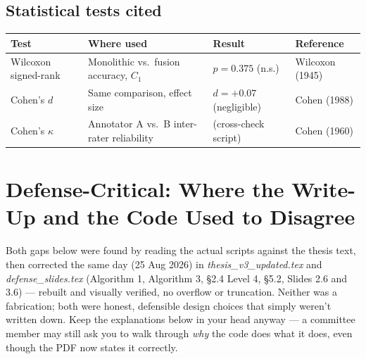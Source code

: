 \documentclass[11pt,a4paper]{article}
\begin{document}
\subsection*{Statistical tests cited}
\begin{center}
\begin{tabular}{@{}p{2.6cm}p{4.4cm}p{2.6cm}p{4cm}@{}}
\toprule
\textbf{Test} & \textbf{Where used} & \textbf{Result} & \textbf{Reference} \\
\midrule
Wilcoxon signed-rank & Monolithic vs.\ fusion accuracy, $C_1$ & $p=0.375$ (n.s.) & Wilcoxon (1945) \cite{wilcoxon1945} \\[3pt]
Cohen's $d$ & Same comparison, effect size & $d=+0.07$ (negligible) & Cohen (1988) \cite{cohen1988} \\[3pt]
Cohen's $\kappa$ & Annotator A vs.\ B inter-rater reliability & (cross-check script) & Cohen (1960) \cite{cohen1960} \\
\bottomrule
\end{tabular}
\end{center}

\section{Defense-Critical: Where the Write-Up and the Code Used to Disagree}
Both gaps below were found by reading the actual scripts against the thesis text, then corrected the same day (25 Aug 2026) in \emph{thesis\_v3\_updated.tex} and \emph{defense\_slides.tex} (Algorithm 1, Algorithm 3, \S2.4 Level 4, \S5.2, Slides 2.6 and 3.6) --- rebuilt and visually verified, no overflow or truncation. Neither was a fabrication; both were honest, defensible design choices that simply weren't written down. Keep the explanations below in your head anyway --- a committee member may still ask you to walk through \emph{why} the code does what it does, even though the PDF now states it correctly.
\end{document}
